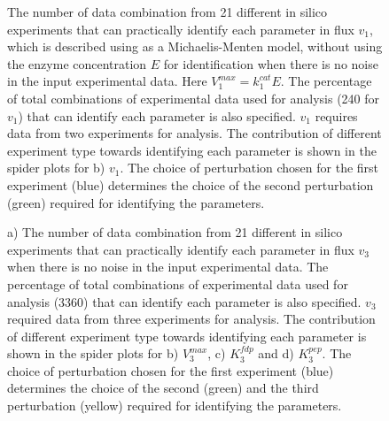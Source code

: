 \documentclass[10pt]{article}
\begin{document}
\begin{figure}[!tbhp]
	\caption{The number of data combination from 21 different in silico experiments that can practically identify each parameter in flux $v_1$, which is described using as a Michaelis-Menten model, without using the enzyme concentration $E$ for identification when there is no noise in the input experimental data. Here $V_1^{max} = k_1^{cat}E$. The percentage of total combinations of experimental data used for analysis (240 for $v_1$) that can identify each parameter is also specified. $v_1$ requires data from two experiments for analysis. The contribution of different experiment type towards identifying each parameter is shown in the spider plots for b) $v_1$. The choice of perturbation chosen for the first experiment (blue) determines the choice of the second perturbation (green) required for identifying the parameters.}\label{fig:v1_v1max_ck_ident}
\end{figure}	

\begin{figure}[!tbhp]
	\caption{a) The number of data combination from 21 different in silico experiments that can practically identify each parameter in flux $v_3$ when there is no noise in the input experimental data. The percentage of total combinations of experimental data used for analysis (3360) that can identify each parameter is also specified. $v_3$ required data from three experiments for analysis. The contribution of different experiment type towards identifying each parameter is shown in the spider plots for b) $V_3^{max}$, c) $K_3^{fdp}$ and d) $K_3^{pep}$. The choice of perturbation chosen for the first experiment (blue) determines the choice of the second (green) and the third perturbation (yellow) required for identifying the parameters.}\label{fig:v3_1_ck_ident}
\end{figure}
\end{document}
